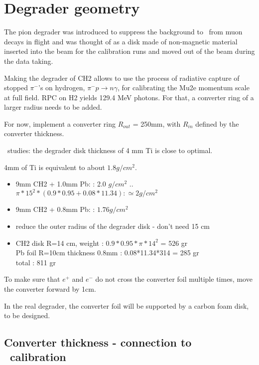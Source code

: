 \section{Degrader geometry}

The pion degrader was introduced to suppress the background to \piplusenu\
from muon decays in flight and was thought of as a disk made of non-magnetic material
inserted into the beam for the calibration runs and moved out of the beam
during the data taking.

Making the degrader of CH2 allows to use the process of radiative capture of
stopped $\pi^-$'s on hydrogen, $\pi^-p \to n\gamma$, for calibrating the Mu2e momentum scale
at full field. RPC on H2 yields 129.4 MeV photons. For that, a converter ring of a larger radius needs to be added.

For now, implement a converter ring $R_{out}$ = 250mm, with $R_{in}$ defined
by the converter thickness.

\piplusenu\ studies: the degrader disk thickness of 4 mm Ti is close to optimal.

4mm of Ti is equivalent to about $1.8 g/cm^2$.
\begin{itemize}
\item
  9mm CH2 + 1.0mm Pb: : 2.0 $g/cm^2$   .. $\pi*15^2*(0.9*0.95 + 0.08*11.34): \simeq 2 g/cm^2$
\item
   9mm CH2 + 0.8mm Pb: : $1.76 g/cm^2$
 \item
   reduce the outer radius of the degrader disk - don't need 15 cm
 \item
   CH2 disk R=14 cm, weight        : $0.9*0.95*\pi*14^2$ = 526 gr \\
   Pb  foil R=10cm thickness 0.8mm : 0.08*11.34*314    = 285 gr \\
   total                           : 811 gr
\end{itemize}

To make sure that $e^+$ and $e^-$ do not cross the converter foil multiple times,
move the converter forward by 1cm.

In the real degrader, the converter foil will be supported
by a carbon foam disk, to be designed.

\subsection{Converter thickness - connection to \piplusenu\  calibration}

